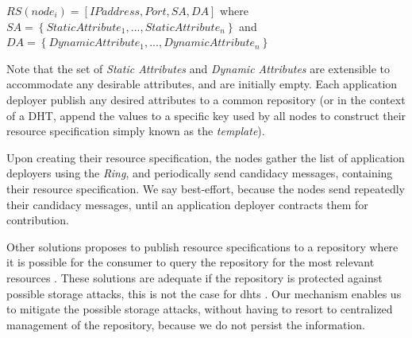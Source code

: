 \documentclass[12pt, titlepage]{uo_temp}
\begin{document}

     \begin{center}
     $RS(node_i) = [IPaddress, Port, SA, DA]$ where \\
     $SA = \left\{{StaticAttribute_1, ..., StaticAttribute_n}\right\}$ and \\
     $DA = \left\{{DynamicAttribute_1, ..., DynamicAttribute_n}\right\}$
     \end{center}

     Note that the set of \emph{Static Attributes} and \emph{Dynamic Attributes} are
     extensible to accommodate any desirable attributes, and are initially empty. Each
     application deployer publish any desired attributes to a common repository (or
     in the context of a DHT, append the values to a specific key used by all nodes to
     construct their resource specification simply known as the \emph{template}).

     Upon creating their resource specification, the nodes gather the list of application
     deployers using the \emph{Ring}, and periodically send candidacy messages, containing
     their resource specification. We say best-effort, because the nodes send repeatedly
     their candidacy messages, until an application deployer contracts them for contribution.

     Other solutions proposes to publish resource specifications to a repository where it
     is possible for the consumer to query the repository for the most relevant resources
     \cite{p2p_collab}. These solutions are adequate if the repository is protected
     against possible storage attacks, this is not the case for \gls{dht}s
     \cite{urdaneta2011survey}. Our mechanism enables us to mitigate the possible storage
     attacks, without having to resort to centralized management of the repository,
     because we do not persist the information.
\end{document}
